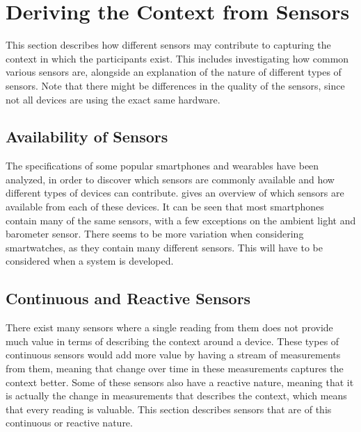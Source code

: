
\section{Deriving the Context from Sensors}
\label{sec:deriving_the_context_from_sensors}
This section describes how different sensors may contribute to capturing the context in which the participants exist. This includes investigating how common various sensors are, alongside an explanation of the nature of different types of sensors. Note that there might be differences in the quality of the sensors, since not all devices are using the exact same hardware.

\subsection{Availability of Sensors}
The specifications of some popular smartphones and wearables have been analyzed, in order to discover which sensors are commonly available and how different types of devices can contribute.  gives an overview of which sensors are available from each of these devices. It can be seen that most smartphones contain many of the same sensors, with a few exceptions on the ambient light and barometer sensor. There seems to be more variation when considering smartwatches, as they contain many different sensors. This will have to be considered when a system is developed.



\subsection{Continuous and Reactive Sensors}
There exist many sensors where a single reading from them does not provide much value in terms of describing the context around a device. These types of continuous sensors would add more value by having a stream of measurements from them, meaning that change over time in these measurements captures the context better. Some of these sensors also have a reactive nature, meaning that it is actually the change in measurements that describes the context, which means that every reading is valuable. This section describes sensors that are of this continuous or reactive nature.

